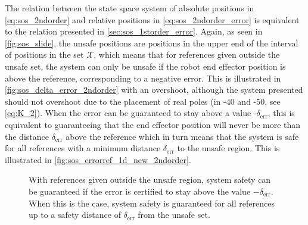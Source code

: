 \vspace{-2mm}
The relation between the state space system of absolute positions in \autoref{eq:sos_2ndorder} and relative positions in \autoref{eq:sos_2ndorder_error} is equivalent to the relation presented in \autoref{sec:sos_1storder_error}.
Again, as seen in \autoref{fig:sos_slide}, the unsafe positions are positions in the upper end of the interval of positions in the set $\mathcal{X}$, which means that for references given outside the unsafe set, the system can only be unsafe if the robot end effector position is above the reference, corresponding to a negative error. This is illustrated in \autoref{fig:sos_delta_error_2ndorder} with an overshoot, although the system presented should  not overshoot due to the placement of real poles (in -40 and -50, see \autoref{eq:K_2}). When the error can be guaranteed to stay above a value -$\delta_\text{err}$, this is equivalent to guaranteeing that the end effector position will never be more than the distance $\delta_\text{err}$ above the reference which in turn means that the system is safe for all references with a minimum distance $\delta_\text{err}$ to the unsafe region. This is illustrated in \autoref{fig:sos_errorref_1d_new_2ndorder}.

\vspace{-2mm}
\begin{figure}[htbp]
	\centering
	\hspace{3mm}
	\hspace{3mm}
	\caption{With references given outside the unsafe region, system safety can be guaranteed if the error is certified to stay above the value $-\delta_\text{err}$. When this is the case, system safety is guaranteed for all references up to a safety distance of $\delta_\text{err}$ from the unsafe set.}
	\label{fig:sets_error_2ndorder}
\end{figure}

